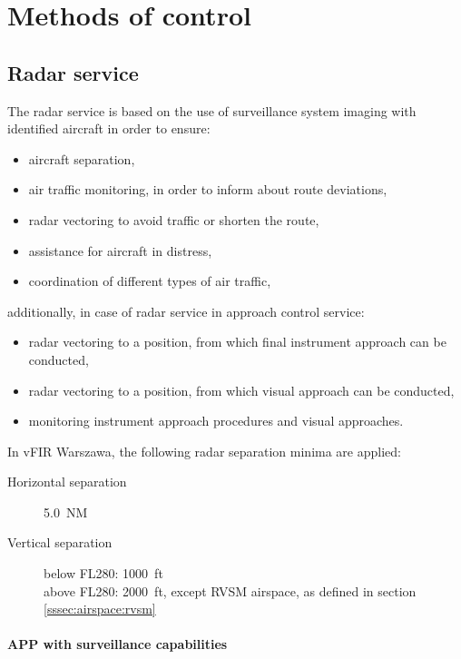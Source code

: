 \chapter{Methods of control}
\label{ch:app:methods}

\section{Radar service}

The radar service is based on the use of surveillance system imaging with
identified aircraft in order to ensure:

\begin{itemize}
\item aircraft separation,
\item air traffic monitoring, in order to inform about route deviations,
\item radar vectoring to avoid traffic or shorten the route,
\item assistance for aircraft in distress,
\item coordination of different types of air traffic,
\end{itemize} additionally, in case of radar service in approach control
service:
\begin{itemize}
\item radar vectoring to a position, from which final instrument approach can be
conducted,
\item radar vectoring to a position, from which visual approach can be
conducted,
\item monitoring instrument approach procedures and visual approaches.
\end{itemize}

In vFIR Warszawa, the following radar separation minima are applied:

\begin{description}
\item[Horizontal separation] 5.0~NM
\item[Vertical separation]\parbox[t]{0.8\textwidth}{ below FL280: 1000~ft\\
above FL280: 2000~ft, except RVSM airspace, as defined in section
\ref{sssec:airspace:rvsm}}
\end{description}

\subsubsection{APP with surveillance capabilities}

